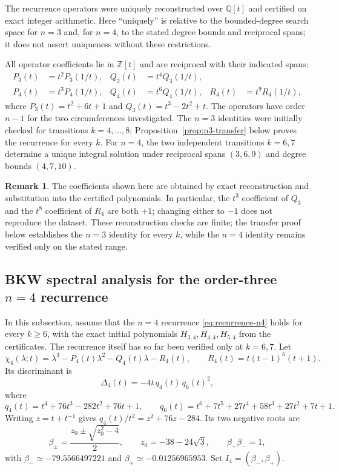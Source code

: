 \documentclass[11pt,a4paper]{article}
\theoremstyle{definition}
\newtheorem{remark}[theorem]{Remark}
\begin{document}
The recurrence operators were uniquely reconstructed over
$\mathbb{Q}[t]$ and certified on exact integer arithmetic. Here
``uniquely'' is relative to the bounded-degree search space for $n=3$
and, for $n=4$, to the stated degree bounds and reciprocal spans; it does
not assert uniqueness without these restrictions.

All operator coefficients lie in $\mathbb{Z}[t]$ and are reciprocal with
their indicated spans:
\[
\begin{aligned}
P_3(t)&=t^2P_3(1/t),&
Q_3(t)&=t^4Q_3(1/t),\\
P_4(t)&=t^3P_4(1/t),&
Q_4(t)&=t^6Q_4(1/t),&
R_4(t)&=t^9R_4(1/t),
\end{aligned}
\]
where $P_3(t)=t^2+6t+1$ and $Q_3(t)=t^3-2t^2+t$. The operators have order $n-1$ for the two circumferences investigated.
The $n=3$ identities were initially
checked for transitions $k=4,\ldots,8$; Proposition~\ref{prop:n3-transfer}
below proves the recurrence for every $k$. For $n=4$, the two independent
transitions $k=6,7$ determine a unique integral solution under reciprocal
spans $(3,6,9)$ and degree bounds $(4,7,10)$.

\begin{remark}
The coefficients shown here are obtained by exact reconstruction and
substitution into the certified polynomials. In particular, the
$t^3$ coefficient of $Q_3$ and the $t^8$ coefficient of $R_4$ are both
$+1$; changing either to $-1$ does not reproduce the dataset. These
reconstruction checks are finite; the transfer proof below establishes
the $n=3$ identity for every $k$, while the $n=4$ identity remains
verified only on the stated range.
\end{remark}

\subsection[BKW spectral analysis for n=4]{BKW spectral analysis for the order-three $n=4$ recurrence}
\label{sec:n4-bkw}

In this subsection, assume that the $n=4$ recurrence
\eqref{eq:recurrence-n4} holds for every $k\ge6$, with the exact initial
polynomials $H_{3,4},H_{4,4},H_{5,4}$ from the certificates. The
recurrence itself has so far been verified only at $k=6,7$.
Let
\[
\chi_4(\lambda;t)=\lambda^3-P_4(t)\lambda^2-Q_4(t)\lambda-R_4(t),
\qquad R_4(t)=t(t-1)^6(t+1).
\]
Its discriminant is
\[
\Delta_4(t)=-4t\,q_4(t)\,q_6(t)^2,
\]
where
\[
q_4(t)=t^4+76t^3-282t^2+76t+1,\qquad
q_6(t)=t^6+7t^5+27t^4+58t^3+27t^2+7t+1.
\]
Writing $z=t+t^{-1}$ gives $q_4(t)/t^2=z^2+76z-284$. Its two
negative roots are
\[
\beta_\pm=\frac{z_0\pm\sqrt{z_0^2-4}}2,\qquad
z_0=-38-24\sqrt3,\qquad \beta_+\beta_-=1,
\]
with $\beta_-\simeq-79.5566497221$ and
$\beta_+\simeq-0.01256965953$. Set
$I_4=(\beta_-,\beta_+)$.
\end{document}
